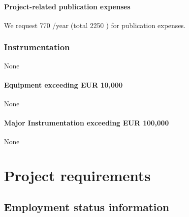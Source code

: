 \documentclass[10pt,fleqn,twoside]{article}
\begin{document}
\paragraph{Project-related publication expenses}

We request 770 \EUR{}/year (total 2250 \EUR{}) for publication expenses.

\subsubsection{Instrumentation}

None 

\paragraph{Equipment exceeding EUR 10,000} 

None

\paragraph{Major Instrumentation exceeding EUR 100,000} 

None

% 
% 
% 
% 
% 
% 
% 

\section{Project requirements}
\renewcommand{\leftmark}{\sc Project requirements}

\subsection{Employment status information}
\end{document}

